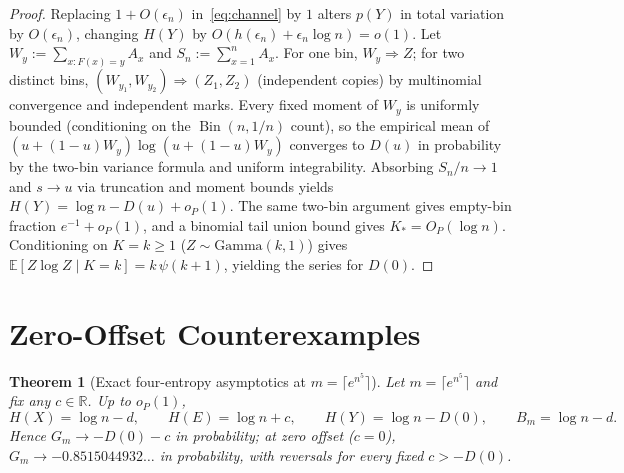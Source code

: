 \documentclass[11pt]{article}
\theoremstyle{plain}
\newtheorem{theorem}{Theorem}
\theoremstyle{definition}
\theoremstyle{remark}
\DeclareMathOperator{\Bin}{Bin}
\begin{document}
\begin{proof}
Replacing $1 + O(\epsilon_n)$ in~\eqref{eq:channel} by $1$ alters $p(Y)$ in total variation by $O(\epsilon_n)$, changing $H(Y)$ by $O(h(\epsilon_n) + \epsilon_n \log n) = o(1)$. Let $W_y := \sum_{x: F(x) = y} A_x$ and $S_n := \sum_{x=1}^n A_x$. For one bin, $W_y \Rightarrow Z$; for two distinct bins, $(W_{y_1}, W_{y_2}) \Rightarrow (Z_1, Z_2)$ (independent copies) by multinomial convergence and independent marks. Every fixed moment of $W_y$ is uniformly bounded (conditioning on the $\Bin(n, 1/n)$ count), so the empirical mean of $(u + (1-u)W_y)\log(u + (1-u)W_y)$ converges to $D(u)$ in probability by the two-bin variance formula and uniform integrability. Absorbing $S_n/n \to 1$ and $s \to u$ via truncation and moment bounds yields $H(Y) = \log n - D(u) + o_P(1)$. The same two-bin argument gives empty-bin fraction $e^{-1} + o_P(1)$, and a binomial tail union bound gives $K_* = O_P(\log n)$. Conditioning on $K = k \ge 1$ ($Z \sim \mathrm{Gamma}(k, 1)$) gives $\mathbb{E}[Z \log Z \mid K = k] = k\,\psi(k+1)$, yielding the series for $D(0)$.
\end{proof}

\section{Zero-Offset Counterexamples}

\begin{theorem}[Exact four-entropy asymptotics at $m = \lceil e^{n^5} \rceil$]\label{thm:exact}
Let $m = \lceil e^{n^5} \rceil$ and fix any $c \in \mathbb{R}$. Up to $o_P(1)$,
\[
H(X) = \log n - d, \qquad
H(E) = \log n + c, \qquad
H(Y) = \log n - D(0), \qquad
B_m = \log n - d.
\]
Hence $G_m \to -D(0) - c$ in probability; at zero offset ($c = 0$), $G_m \to -0.8515044932\dots$ in probability, with reversals for every fixed $c > -D(0)$.
\end{theorem}
\end{document}
